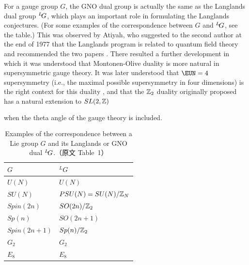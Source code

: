 For a gauge group $G$, the GNO dual group is actually the same as
the Langlands dual group $^L\negthinspace G$, which plays an
important role in formulating the Langlands conjectures. (For some
examples of the correspondence between $G$ and $^L\negthinspace
G$, see the table.) This was observed by Atiyah, who suggested to
the second author at the end of 1977 that the Langlands program is
related to quantum field theory and recommended the two papers
\cite{ref10,ref12}. There resulted a further development
\cite{ref13} in which it was understood that Montonen-Olive duality is
more natural in supersymmetric gauge theory.  It was later
understood that ${\EUN}=4$ supersymmetry (i.e., the maximal
possible supersymmetry in four dimensions) is the right context
for this duality \cite{ref14}, and that the
$\Bbb{Z}_2$ duality originally proposed has a natural extension to
$SL(2,\Bbb{Z})$ 

\cite{ref15,ref16} when the theta angle of the gauge theory is
included.\par\medskip \begin{table}[htbp]
\centering
\begin{tabular}{ll}
\toprule
$G$ & ${}^L G$ \\
\midrule
$U(N)$ & $U(N)$ \\
$SU(N)$ & $PSU(N)=SU(N)/\Bbb{Z}_N$ \\
$Spin(2n)$ & $SO(2n)/\Bbb{Z}_2$ \\
$Sp(n)$ & $SO(2n+1)$ \\
$Spin(2n+1)$ & $Sp(n)/\Bbb{Z}_2$ \\
$G_2$ & $G_2$ \\
$E_8$ & $E_8$ \\
\bottomrule
\end{tabular}
\caption{Examples of the correspondence between a Lie group $G$ and its Langlands or GNO dual ${}^L\negthinspace G$.（原文 Table~1）}
\label{tab:gno-dual}
\end{table}

 

